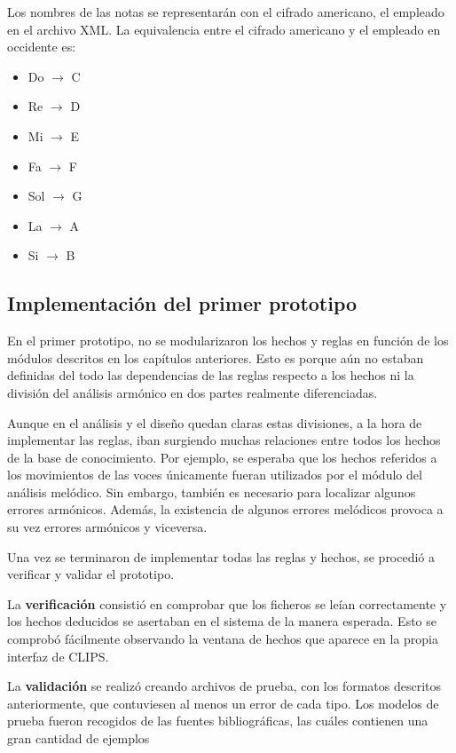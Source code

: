 Los nombres de las notas se representarán con el cifrado americano, el empleado en el archivo XML. La equivalencia entre el cifrado americano y el empleado en occidente es:

\begin{itemize}

	\item Do $\rightarrow$ C
	\item Re $\rightarrow$ D
	\item Mi $\rightarrow$ E
	\item Fa $\rightarrow$ F
	\item Sol $\rightarrow$ G
	\item La $\rightarrow$ A
	\item Si $\rightarrow$ B

\end{itemize}

\subsection{Implementación del primer prototipo}

En el primer prototipo, no se modularizaron los hechos y reglas en función de los módulos descritos en los capítulos anteriores. Esto es porque aún no estaban definidas del todo las dependencias de las reglas respecto a los hechos ni la división del análisis armónico en dos partes realmente diferenciadas. 

Aunque en el análisis y el diseño quedan claras estas divisiones, a la hora de implementar las reglas, iban surgiendo muchas relaciones entre todos los hechos de la base de conocimiento. Por ejemplo, se esperaba que los hechos referidos a los movimientos de las voces únicamente fueran utilizados por el módulo del análisis melódico. Sin embargo, también es necesario para localizar algunos errores armónicos. Además, la existencia de algunos errores melódicos provoca a su vez errores armónicos y viceversa. 

Una vez se terminaron de implementar todas las reglas y hechos, se procedió a verificar y validar el prototipo. 

La  \textbf{verificación} consistió en comprobar que los ficheros se leían correctamente y los hechos deducidos se asertaban en el sistema de la manera esperada. Esto se comprobó fácilmente observando la ventana de hechos que aparece en la propia interfaz de CLIPS.

La \textbf{validación} se realizó creando archivos de prueba, con los formatos descritos anteriormente, que contuviesen al menos un error de cada tipo. Los modelos de prueba fueron recogidos de las fuentes bibliográficas, las cuáles contienen una gran cantidad de ejemplos

